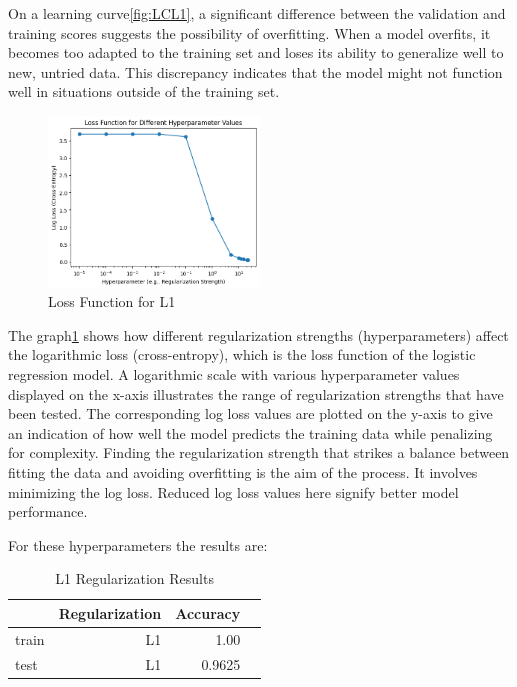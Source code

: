 \documentclass[12pt,a4paper,twocolumn]{article}
\begin{document}
On a learning curve\ref{fig:LCL1}, a significant difference between the validation and training scores suggests the possibility of overfitting. When a model overfits, it becomes too adapted to the training set and loses its ability to generalize well to new, untried data. This discrepancy indicates that the model might not function well in situations outside of the training set.

\begin{figure}[H]
\includegraphics[width=0.5\textwidth]{images2/lossL1.png}
\centering
\caption{\label{fig:LossL1} Loss Function for L1 }
\end{figure}
The graph\ref{fig:LossL1} shows how different regularization strengths (hyperparameters) affect the logarithmic loss (cross-entropy), which is the loss function of the logistic regression model. A logarithmic scale with various hyperparameter values displayed on the x-axis illustrates the range of regularization strengths that have been tested. The corresponding log loss values are plotted on the y-axis to give an indication of how well the model predicts the training data while penalizing for complexity. Finding the regularization strength that strikes a balance between fitting the data and avoiding overfitting is the aim of the process. It involves minimizing the log loss. Reduced log loss values here signify better model performance.

For these hyperparameters the results are:
\begin{table}[h!]
    \centering
\begin{tabular}{lrrr}
\toprule
{}& Regularization &       Accuracy  \\
\midrule
train & L1 &  1.00  \\
test  & L1 &  0.9625 \\

\bottomrule
\end{tabular}
    \caption{L1 Regularization Results}
    \label{tab:resultsL1}
\end{table}
\end{document}
